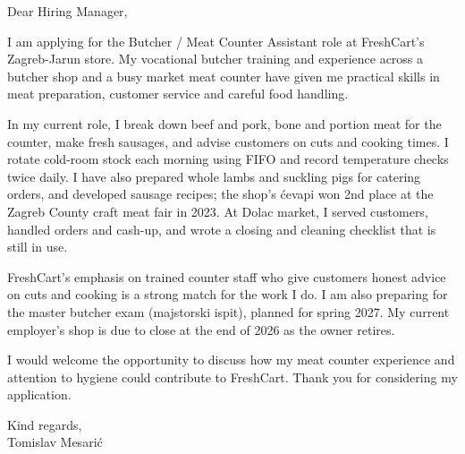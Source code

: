\documentclass[11pt,a4paper]{article}
\begin{document}
\noindent Dear Hiring Manager,

\vspace{0.8em}
\noindent I am applying for the Butcher / Meat Counter Assistant role at FreshCart’s Zagreb-Jarun store. My vocational butcher training and experience across a butcher shop and a busy market meat counter have given me practical skills in meat preparation, customer service and careful food handling.

\vspace{0.8em}
\noindent In my current role, I break down beef and pork, bone and portion meat for the counter, make fresh sausages, and advise customers on cuts and cooking times. I rotate cold-room stock each morning using FIFO and record temperature checks twice daily. I have also prepared whole lambs and suckling pigs for catering orders, and developed sausage recipes; the shop’s ćevapi won 2nd place at the Zagreb County craft meat fair in 2023. At Dolac market, I served customers, handled orders and cash-up, and wrote a closing and cleaning checklist that is still in use.

\vspace{0.8em}
\noindent FreshCart’s emphasis on trained counter staff who give customers honest advice on cuts and cooking is a strong match for the work I do. I am also preparing for the master butcher exam (majstorski ispit), planned for spring 2027. My current employer’s shop is due to close at the end of 2026 as the owner retires.

\vspace{0.8em}
\noindent I would welcome the opportunity to discuss how my meat counter experience and attention to hygiene could contribute to FreshCart. Thank you for considering my application.

\vspace{1.2em}
\noindent Kind regards,\\
Tomislav Mesarić
\end{document}
